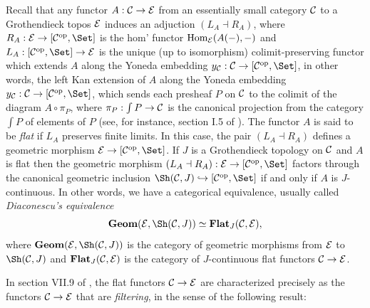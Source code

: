 \documentclass[a4paper,12pt]{article}
\begin{document}
Recall that any functor $A:{\cal C}\to {\cal E}$ from an essentially small category $\cal C$ to a Grothendieck topos $\cal E$ induces an adjuction $(L_{A} \dashv R_{A})$, where $R_{A}:{\cal E}\to [{\cal C}^{\textup{op}}, \Set]$ is the \acc hom' functor $\textup{Hom}_{\cal E}(A(-),-)$ and $L_{A}:[{\cal C}^{\textup{op}}, \Set] \to {\cal E}$ is the unique (up to isomorphism) colimit-preserving functor which extends $A$ along the Yoneda embedding $y_{\cal C}:{\cal C}\to [{\cal C}^{\textup{op}}, \Set]$, in other words, the left Kan extension of $A$ along the Yoneda embedding $y_{\cal C}:{\cal C}\to [{\cal C}^{\textup{op}}, \Set]$, which sends each presheaf $P$ on $\cal C$ to the colimit of the diagram $A\circ \pi_{P}$, where $\pi_{P}:{\int P} \to {\cal C}$ is the canonical projection from the category ${\int P}$ of elements  of $P$ (see, for instance, section I.5 of \cite{MM}). The functor $A$ is said to be \emph{flat} if $L_{A}$ preserves finite limits. In this case, the pair $(L_{A}\dashv R_{A})$ defines a geometric morphism ${\cal E}\to [{\cal C}^{\textup{op}}, \Set]$. If $J$ is a Grothendieck topology on $\cal C$ and $A$ is flat then the geometric morphism $(L_{A}\dashv R_{A}):{\cal E}\to [{\cal C}^{\textup{op}}, \Set]$ factors through the canonical geometric inclusion $\Sh({\cal C}, J)\hookrightarrow [{\cal C}^{\textup{op}}, \Set]$ if and only if $A$ is $J$-continuous. In other words, we have a categorical equivalence, usually called \emph{Diaconescu's equivalence}
\[
\textbf{Geom}({\cal E}, \Sh({\cal C}, J))\simeq \textbf{Flat}_{J}({\cal C}, {\cal E}),
\]
where $\textbf{Geom}({\cal E}, \Sh({\cal C}, J))$ is the category of geometric morphisms from ${\cal E}$ to $\Sh({\cal C}, J)$ and $\textbf{Flat}_{J}({\cal C}, {\cal E})$ is the category of $J$-continuous flat functors ${\cal C}\to {\cal E}$.

In section VII.9 of \cite{MM}, the flat functors ${\cal C}\to {\cal E}$ are characterized precisely as the functors ${\cal C}\to {\cal E}$ that are \emph{filtering}, in the sense of the following result:
\end{document}
